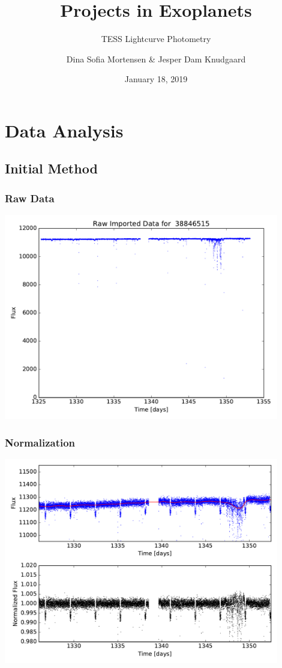 \documentclass[notes]{beamer}
\title{Projects in Exoplanets}
\subtitle{TESS Lightcurve Photometry}
\author{Dina Sofia Mortensen \& Jesper Dam Knudgaard}
\institute{Stellar Astrophysics Centre, Aarhus University}
\date{January 18, 2019}
\begin{document}
\begin{frame}
\titlepage
\end{frame}

\section{Data Analysis}

\subsection{Initial Method}

\begin{frame}
\frametitle{Raw Data}
\centering
\includegraphics[width=0.9\textwidth]{../figures/2019-1-15_16:2:14_rawdata_TIC38846515.pdf}
\end{frame}

\begin{frame}
\frametitle{Normalization}
\centering
\includegraphics[width=0.9\textwidth]{../figures/2018-11-9_14:25:51_norm_curve0.pdf}
\end{frame}
\end{document}
